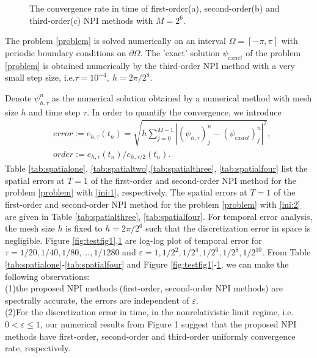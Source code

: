 \documentclass[final,leqno,showlabe]{siamltex}
\begin{document}
\begin{figure}[tbhp]%
  \centering

  \centering
  \caption{The convergence rate in time of first-order(a), second-order(b) and third-order(c) NPI methods  with $M=2^6$.}
\label{fig:testfig2}
\end{figure}


The problem \eqref{problem} is solved numerically on an interval $\Omega=[-\pi,\pi]$ with periodic boundary conditions on $\partial\Omega$. The 'exact' solution $\psi_{exact}$ of the problem \eqref{problem} is obtained numerically by the third-order NPI method
with a very small step size, i.e.$\tau=10^{-4},\ h=2\pi/2^8$.

Denote $\psi_{h,\tau}^{n}$ as the numerical solution obtained by a numerical method with mesh size $h$ and time step $\tau$. In order to quantify the convergence, we introduce
\begin{align*}
&error:=e_{h,\tau}(t_n)=\sqrt{h\sum_{j=0}^{M-1}|(\psi_{h,\tau})_{j}^{n}-(\psi_{exact})_{j}^{n}|^2},\\
&order:=e_{h,\tau}(t_n)/e_{h,\tau/2}(t_n).
\end{align*}
Table \ref{tab:spatialone}, \ref{tab:spatialtwo},\ref{tab:spatialthree}, \ref{tab:spatialfour} list the spatial errors at $T=1$ of the first-order and second-order NPI method for the problem \eqref{problem} with \ref{ini:1}, respectively. The spatial errors at $T=1$ of the first-order and second-order NPI method for the problem \eqref{problem} with \ref{ini:2} are given in Table \ref{tab:spatialthree}, \ref{tab:spatialfour}. For temporal error analysis, the mesh size $h$ is fixed to $h=2\pi/2^6$ such that the discretization error in space is negligible. Figure \ref{fig:testfig1},\ref{fig:testfig2} are log-log plot of temporal error for $\tau=1/20,1/40,1/80,...,1/1280$ and $\varepsilon=1,1/2^2,1/2^4,1/2^6,1/2^8,1/2^10$. From Table \ref{tab:spatialone}-\ref{tab:spatialfour} and Figure \ref{fig:testfig1}-\ref{fig:testfig2}, we can make the following observations:\\
(1)the proposed NPI methods (first-order, second-order NPI methods) are spectrally accurate, the errors are independent of $\varepsilon$.\\
(2)For the discretization error in time, in the nonrelativistic limit regime, i.e. $0<\varepsilon\leq 1$, our numerical results from Figure 1 suggest that the proposed NPI methods have first-order, second-order and third-order uniformly convergence rate, respectively.
\end{document}
